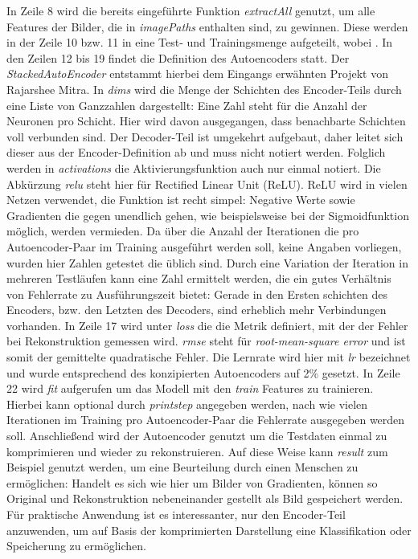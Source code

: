 In Zeile 8 wird die bereits eingeführte Funktion \textit{extractAll} genutzt, um alle Features der Bilder, die in \textit{imagePaths} enthalten sind, zu gewinnen. Diese werden in der Zeile 10 bzw. 11 in eine Test- und Trainingsmenge aufgeteilt, wobei .
In den Zeilen 12 bis 19 findet die Definition des Autoencoders statt. Der \textit{StackedAutoEncoder} entstammt hierbei dem Eingangs erwähnten Projekt von Rajarshee Mitra. In \textit{dims} wird die Menge der Schichten des Encoder-Teils durch eine Liste von Ganzzahlen dargestellt: Eine Zahl steht für die Anzahl der Neuronen pro Schicht. Hier wird davon ausgegangen, dass benachbarte Schichten voll verbunden sind. Der Decoder-Teil ist umgekehrt aufgebaut, daher leitet sich dieser aus der Encoder-Definition ab und muss nicht notiert werden. Folglich werden in \textit{activations} die Aktivierungsfunktion auch nur einmal notiert. Die Abkürzung \textit{relu} steht hier für Rectified Linear Unit (ReLU).  ReLU wird in vielen Netzen verwendet, die Funktion ist recht simpel: Negative Werte sowie Gradienten die gegen unendlich gehen, wie beispielsweise bei der Sigmoidfunktion möglich, werden vermieden. Da über die Anzahl der Iterationen die pro Autoencoder-Paar im Training ausgeführt werden soll, keine Angaben vorliegen, wurden hier Zahlen getestet die üblich sind. Durch eine Variation der Iteration in mehreren Testläufen kann eine Zahl ermittelt werden, die ein gutes Verhältnis von Fehlerrate zu Ausführungszeit bietet: Gerade in den Ersten schichten des Encoders, bzw. den Letzten des Decoders, sind erheblich mehr Verbindungen vorhanden. In Zeile 17 wird unter \textit{loss} die die Metrik definiert, mit der der Fehler bei Rekonstruktion gemessen wird. \textit{rmse} steht für \textit{root-mean-square error} und ist somit der gemittelte quadratische Fehler. Die Lernrate wird hier mit \textit{lr} bezeichnet und wurde entsprechend des konzipierten Autoencoders auf 2\% gesetzt.
In Zeile 22 wird \textit{fit} aufgerufen um das Modell mit den \textit{train} Features zu trainieren. Hierbei kann optional durch \textit{print\textunderscore step} angegeben werden, nach wie vielen Iterationen im Training pro Autoencoder-Paar die Fehlerrate ausgegeben werden soll.
Anschließend wird der Autoencoder genutzt um die Testdaten einmal zu komprimieren und wieder zu rekonstruieren. Auf diese Weise kann \textit{result} zum Beispiel genutzt werden, um eine Beurteilung durch einen Menschen zu ermöglichen: Handelt es sich wie hier um Bilder von Gradienten, können so Original und Rekonstruktion nebeneinander gestellt als Bild gespeichert werden. Für praktische Anwendung ist es interessanter, nur den Encoder-Teil anzuwenden, um auf Basis der komprimierten Darstellung eine Klassifikation oder Speicherung zu ermöglichen.  